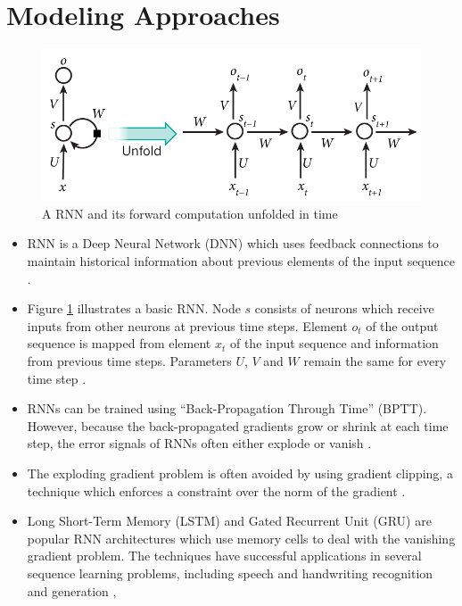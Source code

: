 \section{Modeling Approaches}

\begin{figure}[H]
    \centering
    \includegraphics[width=0.8\linewidth]{../images/LeCun2015-deep_learning-fig5_rnn.jpg}
    \caption{A RNN and its forward computation unfolded in time \cite{LeCun2015}} \label{fig:rnn}
\end{figure}
\begin{itemize}
    \item RNN is a Deep Neural Network (DNN) which uses feedback connections to maintain historical information about previous elements of the input sequence \cite{Hochreiter:1997:LSM:1246443.1246450, LeCun2015}.
    \item Figure \ref{fig:rnn} illustrates a basic RNN. Node $s$ consists of neurons which receive inputs from other neurons at previous time steps. Element $o_t$ of the output sequence is mapped from element $x_t$ of the input sequence and information from previous time steps. Parameters $U$, $V$ and $W$ remain the same for every time step \cite{LeCun2015}.
    \item RNNs can be trained using ``Back-Propagation Through Time'' (BPTT). However, because the back-propagated gradients grow or shrink at each time step, the error signals of RNNs often either explode or vanish \cite{Hochreiter01gradientflow, LeCun2015}.
    \item The exploding gradient problem is often avoided by using gradient clipping, a technique which enforces a constraint over the norm of the gradient \cite{conf/icml/JozefowiczZS15}.
    \item Long Short-Term Memory (LSTM) and Gated Recurrent Unit (GRU) are popular RNN architectures which use memory cells to deal with the vanishing gradient problem. The techniques have successful applications in several sequence learning problems, including speech and handwriting recognition and generation \cite{DBLP:journals/corr/Graves13, cho14GRU}, 
\end{itemize}

